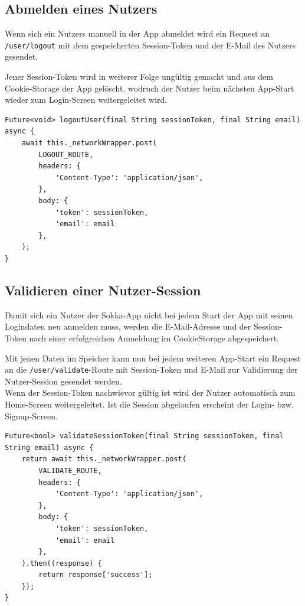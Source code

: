 \subsection{Abmelden eines Nutzers}

Wenn sich ein Nutzers manuell in der App abmeldet wird ein Request an \lstinline{/user/logout} mit
dem gespeicherten Session-Token und der E-Mail des Nutzers gesendet.

Jener Session-Token wird in weiterer Folge ungültig gemacht und aus dem Cookie-Storage der App
gelöscht, wodruch der Nutzer beim nächsten App-Start wieder zum Login-Screen weitergeleitet wird.

\begin{lstlisting}
Future<void> logoutUser(final String sessionToken, final String email) async {
    await this._networkWrapper.post(
        LOGOUT_ROUTE,
        headers: {
            'Content-Type': 'application/json',
        },
        body: {
            'token': sessionToken,
            'email': email
        },
    );
}
\end{lstlisting}

\subsection{Validieren einer Nutzer-Session}

Damit sich ein Nutzer der Sokka-App nicht bei jedem Start der App mit seinen Logindaten neu
anmelden muss, werden die E-Mail-Adresse und der Session-Token nach einer erfolgreichen Anmeldung
im CookieStorage abgespeichert.

Mit jenen Daten im Speicher kann nun bei jedem weiteren App-Start ein Request an die
\lstinline{/user/validate}-Route mit Session-Token und E-Mail zur Validierung der Nutzer-Session
gesendet werden.\\
Wenn der Session-Token nachwievor gültig ist wird der Nutzer automatisch zum Home-Screen weitergeleitet.
Ist die Session abgelaufen erscheint der Login- bzw. Signup-Screen.

\begin{lstlisting}
Future<bool> validateSessionToken(final String sessionToken, final String email) async {
    return await this._networkWrapper.post(
        VALIDATE_ROUTE,
        headers: {
            'Content-Type': 'application/json',
        },
        body: {
            'token': sessionToken,
            'email': email
        },
    ).then((response) {
        return response['success'];
    });
}
\end{lstlisting}

